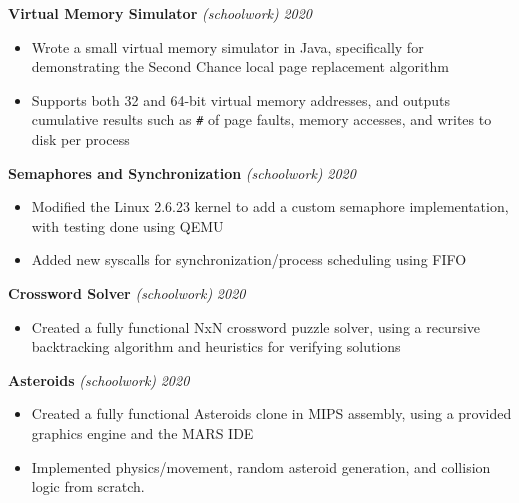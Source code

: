 \documentclass[10pt]{article}
\begin{document}
\begin{flushleft}
		\vspace{2.25mm}
		\textbf{Virtual Memory Simulator} \textit{(schoolwork)} \hfill \textit{\small 2020}
		\vspace{-2mm}
		\begin{itemize}
			\item Wrote a small virtual memory simulator in Java, specifically for demonstrating the Second Chance local page replacement algorithm
			\vspace{-2mm}
			\item Supports both 32 and 64-bit virtual memory addresses, and outputs cumulative results such as \verb!#! of page faults, memory accesses, and writes to disk per process
		\end{itemize}
		\vspace{-1.5mm}
		\pagebreak
		\textbf{Semaphores and Synchronization} \textit{(schoolwork)} \hfill \textit{\small 2020}
		\vspace{-2mm}
		\begin{itemize}
			\item Modified the Linux 2.6.23 kernel to add a custom semaphore implementation, with testing done using QEMU
			\vspace{-2mm}
			\item Added new syscalls for synchronization/process scheduling using FIFO
		\end{itemize}
		\vspace{-1.5mm}
		\textbf{Crossword Solver} \textit{(schoolwork)} \hfill \textit{\small 2020}
		\vspace{-2mm}
		\begin{itemize}
			\item Created a fully functional NxN crossword puzzle solver, using a recursive backtracking algorithm and heuristics for verifying solutions
		\end{itemize}
		\vspace{-1.5mm}
		\textbf{Asteroids} \textit{(schoolwork)} \hfill \textit{\small 2020}
		\vspace{-2mm}
		\begin{itemize}
			\item Created a fully functional Asteroids clone in MIPS assembly, using a provided graphics engine and the MARS IDE
			\vspace{-2mm}
			\item Implemented physics/movement, random asteroid generation, and collision logic from scratch.
		\end{itemize}
		\vspace{-1.5mm}

\end{flushleft}
\end{document}

